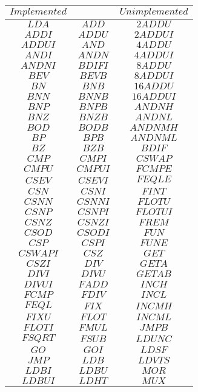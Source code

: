 \documentclass[conference]{IEEEtran}
\begin{document}
\begin{table}
\tiny
\begin{tabular}{cc|c}
\large{$Implemented$} & & \large{$Unimplemented$} \\
\hline

$LDA$ & $ADD$ & $2ADDU$ \\
$ADDI$ & $ADDU$ & $2ADDUI$ \\
$ADDUI$ & $AND$ & $4ADDU$ \\
$ANDI$ & $ANDN$ & $4ADDUI$ \\
$ANDNI$ & $BDIFI$ & $8ADDU$ \\
$BEV$ & $BEVB$ & $8ADDUI$ \\
$BN$ & $BNB$ & $16ADDU$ \\
$BNN$ & $BNNB$ & $16ADDUI$ \\
$BNP$ & $BNPB$ & $ANDNH$ \\
$BNZ$ & $BNZB$ & $ANDNL$ \\
$BOD$ & $BODB$ & $ANDNMH$ \\
$BP$ & $BPB$ & $ANDNML$ \\
$BZ$ & $BZB$ & $BDIF$ \\
$CMP$ & $CMPI$ & $CSWAP$ \\
$CMPU$ & $CMPUI$ & $FCMPE$ \\
$CSEV$ & $CSEVI$ & $FEQLE$ \\
$CSN$ & $CSNI$ & $FINT$ \\
$CSNN$ & $CSNNI$ & $FLOTU$ \\
$CSNP$ & $CSNPI$ & $FLOTUI$ \\
$CSNZ$ & $CSNZI$ & $FREM$ \\
$CSOD$ & $CSODI$ & $FUN$ \\
$CSP$ & $CSPI$ & $FUNE$ \\
$CSWAPI$ & $CSZ$ & $GET$ \\
$CSZI$ & $DIV$ & $GETA$ \\
$DIVI$ & $DIVU$ & $GETAB$ \\
$DIVUI$ & $FADD$ & $INCH$ \\
$FCMP$ & $FDIV$ & $INCL$ \\
$FEQL$ & $FIX$ & $INCMH$ \\
$FIXU$ & $FLOT$ & $INCML$ \\
$FLOTI$ & $FMUL$ & $JMPB$ \\
$FSQRT$ & $FSUB$ & $LDUNC$ \\
$GO$ & $GOI$ & $LDSF$ \\
$JMP$ & $LDB$ & $LDVTS$ \\
$LDBI$ & $LDBU$ & $MOR$ \\
$LDBUI$ & $LDHT$ & $MUX$ \\

\end{tabular}
\end{table}
\end{document}
